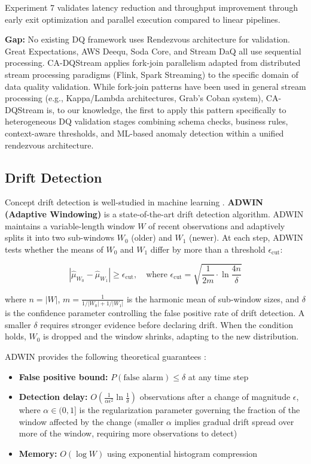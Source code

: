 Experiment 7 validates latency reduction and throughput improvement through early exit optimization and parallel execution compared to linear pipelines.

\textbf{Gap:} No existing DQ framework uses Rendezvous architecture for validation. Great Expectations, AWS Deequ, Soda Core, and Stream DaQ all use sequential processing. CA-DQStream applies fork-join parallelism adapted from distributed stream processing paradigms (Flink, Spark Streaming) to the specific domain of data quality validation. While fork-join patterns have been used in general stream processing (e.g., Kappa/Lambda architectures, Grab's Coban system), CA-DQStream is, to our knowledge, the first to apply this pattern specifically to heterogeneous DQ validation stages combining schema checks, business rules, context-aware thresholds, and ML-based anomaly detection within a unified rendezvous architecture.

\subsection{Drift Detection}

Concept drift detection is well-studied in machine learning \citep{gama2014survey, lu2018learning}. \textbf{ADWIN (Adaptive Windowing)} \citep{bifet2007learning, adwin2025} is a state-of-the-art drift detection algorithm. ADWIN maintains a variable-length window $W$ of recent observations and adaptively splits it into two sub-windows $W_0$ (older) and $W_1$ (newer). At each step, ADWIN tests whether the means of $W_0$ and $W_1$ differ by more than a threshold $\epsilon_{\text{cut}}$:

\begin{equation}
|\hat{\mu}_{W_0} - \hat{\mu}_{W_1}| \geq \epsilon_{\text{cut}}, \quad \text{where } \epsilon_{\text{cut}} = \sqrt{\frac{1}{2m} \cdot \ln \frac{4n}{\delta}}
\end{equation}

where $n = |W|$, $m = \frac{1}{1/|W_0| + 1/|W_1|}$ is the harmonic mean of sub-window sizes, and $\delta$ is the confidence parameter controlling the false positive rate of drift detection. A smaller $\delta$ requires stronger evidence before declaring drift. When the condition holds, $W_0$ is dropped and the window shrinks, adapting to the new distribution.

ADWIN provides the following theoretical guarantees \citep{bifet2007learning}:
\begin{itemize}
    \item \textbf{False positive bound:} $P(\text{false alarm}) \leq \delta$ at any time step
    \item \textbf{Detection delay:} $O\left(\frac{1}{\alpha \epsilon^2} \ln \frac{1}{\delta}\right)$ observations after a change of magnitude $\epsilon$, where $\alpha \in (0, 1]$ is the regularization parameter governing the fraction of the window affected by the change (smaller $\alpha$ implies gradual drift spread over more of the window, requiring more observations to detect)
    \item \textbf{Memory:} $O(\log W)$ using exponential histogram compression
\end{itemize}

